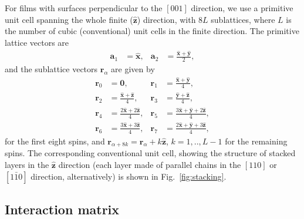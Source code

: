 \documentclass[aps,prx,reprint,runinaddress,superscriptaddress,amsmath,amssymb,floatfix,longbibliography]{revtex4-1}
\renewcommand{\vec}[1]{\boldsymbol{#1}}
\newcommand{\vhat}[1]{\vec{\hat{#1}}}
\begin{document}
For films with surfaces perpendicular to the $[001]$ direction, we use a primitive unit cell spanning the whole finite ($\vhat{z}$) direction, with $8L$ sublattices, where $L$ is the number of cubic (conventional) unit cells in the finite direction. The primitive lattice vectors are
\begin{align}
	\vec{a}_1 &= \vhat{x},  & \vec{a}_2 &= \frac{\vhat{x}+\vhat{y}}{2}, 
\end{align}
and the sublattice vectors $\vec{r}_\alpha$ are given by
\begin{align}
    \vec{r}_0 &=\vec{0}, &
    \vec{r}_1 &= \frac{\vhat{x}+\vhat{y}}{4}, \nonumber \\
    \vec{r}_2 &= \frac{\vhat{x}+\vhat{z}}{4}, &
    \vec{r}_3 &= \frac{\vhat{y}+\vhat{z}}{4}, \nonumber  \\
    \vec{r}_4 &= \frac{2\vhat{x}+2\vhat{z}}{4}, &
    \vec{r}_5 &= \frac{3\vhat{x}+\vhat{y}+2\vhat{z}}{4}, \nonumber  \\
    \vec{r}_6 &= \frac{3\vhat{x}+3\vhat{z}}{4}, &
    \vec{r}_7 &= \frac{2\vhat{x}+\vhat{y}+3\vhat{z}}{4}, 
\end{align}	
for the first eight spins, and $ \vec{r}_{\alpha + 8k} = \vec{r}_{\alpha} + k\vhat{z}$, $k = 1,..,L-1$ for the remaining spins. The corresponding conventional unit cell, showing the structure of stacked layers in the $\vhat{z}$ direction (each layer made of parallel chains in the $[110]$ or $[1 \bar{1} 0]$ direction, alternatively) is shown in Fig.~\ref{fig:stacking}.

\subsection{Interaction matrix}
\end{document}
